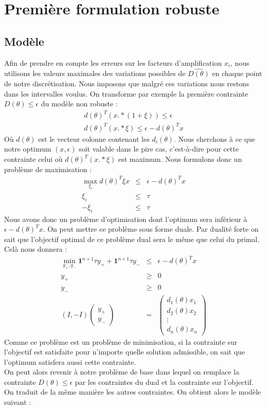 \section{Première formulation robuste}
\subsection{Modèle}

Afin de prendre en compte les erreurs sur les facteurs d'amplification $x_i$, nous utilisons les valeurs maximales des variations possibles de $\hat{D(\theta)}$ en chaque point de notre discrétisation. Nous imposons que malgré ces variations nous restons dans les intervalles voulus. On transforme par exemple la première contrainte $D(\theta)\leq \epsilon$ du modèle non robuste :
\begin{eqnarray*}
d(\theta)^T (x.*(1+\xi)) \leq \epsilon \\ 
d(\theta)^T (x.*\xi) \leq \epsilon- d(\theta)^T x
\end{eqnarray*}
Où $d(\theta)$ est le vecteur colonne contenant les $d_i(\theta)$.
Nous cherchons à ce que notre optimum $(x,\epsilon)$ soit valable dans le pire cas, c'est-à-dire pour cette contrainte celui où $d(\theta)^T (x.*\xi)$ est maximum. Nous formulons donc un problème de maximisation : 
\begin{eqnarray*}
\max_{\xi_i} d(\theta)^T\xi x & \leq & \epsilon- d(\theta)^T x \\
\xi_i & \leq & \tau \\
-\xi_i & \leq & \tau 
\end{eqnarray*}
Nous avons donc un problème d'optimisation dont l'optimum sera inférieur à $\epsilon- d(\theta)^T x $. On peut mettre ce problème sous forme duale. Par dualité forte on sait que l'objectif optimal de ce problème dual sera le même que celui du primal. Celà nous donnera :
\begin{eqnarray*}
\min_{y_+,y_-} \mathbf{1}^{n\times 1}\tau y_++\mathbf{1}^{n\times 1}\tau y_- & \leq & \epsilon- d(\theta)^T x \\
y_+ & \geq & 0 \\
y_- & \geq & 0 \\
(I,-I)\begin{pmatrix}
y_+ \\
y_-
\end{pmatrix}
& = & 
\begin{pmatrix}
d_1(\theta)x_1 \\
d_2(\theta)x_2 \\
\vdots \\
d_n(\theta)x_n 
\end{pmatrix}
\end{eqnarray*}
Comme ce problème est un problème de minimisation, si la contrainte sur l'objectif est satisfaite pour n'importe quelle solution admissible, on sait que l'optimum satisfera aussi cette contrainte.\\
On peut alors revenir à notre problème de base dans lequel on remplace la contrainte $D(\theta)\leq \epsilon$ par les contraintes du dual et la contrainte sur l'objectif.
On traduit de la même manière les autres contraintes. On obtient alors le modèle suivant :


